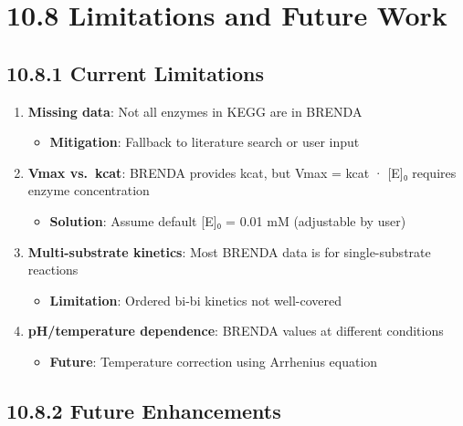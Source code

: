 \hypertarget{limitations-and-future-work}{%
\section{10.8 Limitations and Future
Work}\label{limitations-and-future-work}}

\hypertarget{current-limitations}{%
\subsection{10.8.1 Current Limitations}\label{current-limitations}}

\begin{enumerate}
\def\labelenumi{\arabic{enumi}.}
\tightlist
\item
  \textbf{Missing data}: Not all enzymes in KEGG are in BRENDA

  \begin{itemize}
  \tightlist
  \item
    \textbf{Mitigation}: Fallback to literature search or user input
  \end{itemize}
\item
  \textbf{Vmax vs.~kcat}: BRENDA provides kcat, but Vmax = kcat ·
  {[}E{]}₀ requires enzyme concentration

  \begin{itemize}
  \tightlist
  \item
    \textbf{Solution}: Assume default {[}E{]}₀ = 0.01 mM (adjustable by
    user)
  \end{itemize}
\item
  \textbf{Multi-substrate kinetics}: Most BRENDA data is for
  single-substrate reactions

  \begin{itemize}
  \tightlist
  \item
    \textbf{Limitation}: Ordered bi-bi kinetics not well-covered
  \end{itemize}
\item
  \textbf{pH/temperature dependence}: BRENDA values at different
  conditions

  \begin{itemize}
  \tightlist
  \item
    \textbf{Future}: Temperature correction using Arrhenius equation
  \end{itemize}
\end{enumerate}

\hypertarget{future-enhancements}{%
\subsection{10.8.2 Future Enhancements}\label{future-enhancements}}

